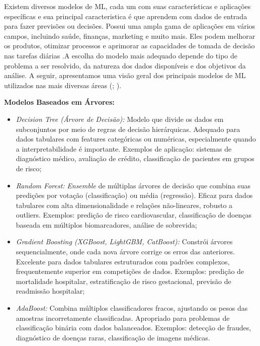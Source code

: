 \documentclass[12pt, a4paper]{report}
\theoremstyle{definition}
\theoremstyle{remark}
\theoremstyle{plain}
\begin{document}
 Existem diversos modelos de ML, cada um com suas características e aplicações específicas e sua principal caracteristica é que aprendem com dados de entrada para fazer previsões ou decisões. Possui uma ampla gama de aplicações em vários campos, incluindo saúde, finanças, marketing e muito mais. Eles podem melhorar os produtos, otimizar processos e aprimorar as capacidades de tomada de decisão nas tarefas diárias \cite{Sarker2021Ml}.A escolha do modelo mais adequado depende do tipo de problema a ser resolvido, da natureza dos dados disponíveis e dos objetivos da análise. A seguir, apresentamos uma visão geral dos principais modelos de ML utilizados nas mais diversas áreas (\cite{kolasa2024}; \cite{rahmani2021}).

\textbf{Modelos Baseados em Árvores:}
\begin{itemize}[noitemsep,topsep=0pt]
    \item \textit{Decision Tree (Árvore de Decisão):} Modelo que divide os dados em subconjuntos por meio de regras de decisão hierárquicas. Adequado para dados tabulares com features categóricas ou numéricas, especialmente quando a interpretabilidade é importante. Exemplos de aplicação: sistemas de diagnóstico médico, avaliação de crédito, classificação de pacientes em grupos de risco;
    
    \item \textit{Random Forest:} \textit{Ensemble} de múltiplas árvores de decisão que combina suas predições por votação (classificação) ou média (regressão). Eficaz para dados tabulares com alta dimensionalidade e relações não-lineares, robusto a outliers. Exemplos: predição de risco cardiovascular, classificação de doenças baseada em múltiplos biomarcadores, análise de sobrevida;
    
    \item \textit{Gradient Boosting (XGBoost, LightGBM, CatBoost):} Constrói árvores sequencialmente, onde cada nova árvore corrige os erros das anteriores. Excelente para dados tabulares estruturados com padrões complexos, frequentemente superior em competições de dados. Exemplos: predição de mortalidade hospitalar, estratificação de risco gestacional, previsão de readmissão hospitalar;
    
    \item \textit{AdaBoost:} Combina múltiplos classificadores fracos, ajustando os pesos das amostras incorretamente classificadas. Apropriado para problemas de classificação binária com dados balanceados. Exemplos: detecção de fraudes, diagnóstico de doenças raras, classificação de imagens médicas.
\end{itemize}
\end{document}
